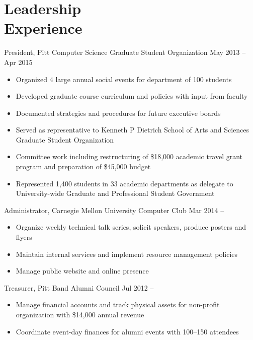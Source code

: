 \documentclass[11pt]{article}
\newcommand{\present}{\phantom{Xxx 20XX}}
\begin{document}
\section{Leadership \\ Experience}

\selectfont
President, Pitt Computer Science Graduate Student Organization
	\hfill May 2013 -- Apr 2015
\normalfont
\begin{itemize}
	\item Organized 4 large annual social events for department of 100 students
	\item Developed graduate course curriculum and policies with input from faculty
	\item Documented strategies and procedures for future executive boards
	\item Served as representative to Kenneth P Dietrich School of Arts and Sciences
		Graduate Student Organization
	\item Committee work including restructuring of \$18,000 academic travel grant program
		and preparation of \$45,000 budget
	\item Represented 1,400 students in 33 academic departments as delegate to
		University-wide Graduate and Professional Student Government
\end{itemize}

\pagebreak

\selectfont
Administrator, Carnegie Mellon University Computer Club
	\hfill Mar 2014 -- \present
\normalfont
\begin{itemize}
	\item Organize weekly technical talk series, solicit speakers, produce posters and flyers
	\item Maintain internal services and implement resource management policies
	\item Manage public website and online presence
\end{itemize}

\selectfont
Treasurer, Pitt Band Alumni Council
	\hfill Jul 2012 -- \present
\normalfont
\begin{itemize}
	\item Manage financial accounts and track physical assets
		for non-profit organization with \$14,000 annual revenue
	\item Coordinate event-day finances for alumni events with 100--150 attendees
\end{itemize}
\end{document}
